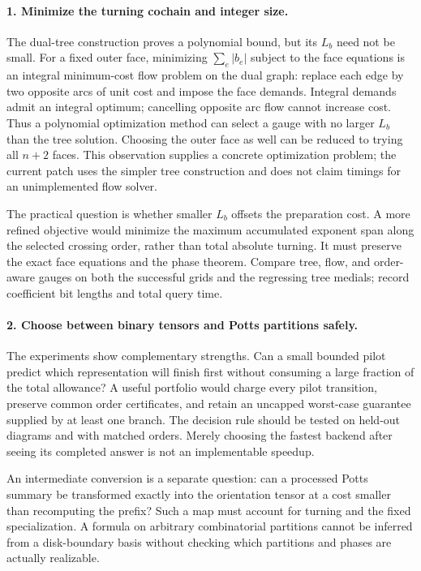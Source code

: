 \documentclass[11pt]{article}
\theoremstyle{definition}
\theoremstyle{remark}
\begin{document}
\paragraph{1. Minimize the turning cochain and integer size.}
The dual-tree construction proves a polynomial bound, but its $L_b$ need
not be small. For a fixed outer face, minimizing $\sum_e|b_e|$ subject to
the face equations is an integral minimum-cost flow problem on the dual
graph: replace each edge by two opposite arcs of unit cost and impose the
face demands. Integral demands admit an integral optimum; cancelling
opposite arc flow cannot increase cost. Thus a polynomial optimization
method can select a gauge with no larger $L_b$ than the tree solution.
Choosing the outer face as well can be reduced to trying all $n+2$ faces.
This observation supplies a concrete optimization problem; the current
patch uses the simpler tree construction and does not claim timings for
an unimplemented flow solver.

The practical question is whether smaller $L_b$ offsets the preparation
cost. A more refined objective would minimize the maximum accumulated
exponent span along the selected crossing order, rather than total
absolute turning. It must preserve the exact face equations and the
phase theorem. Compare tree, flow, and order-aware gauges on both the
successful grids and the regressing tree medials; record coefficient bit
lengths and total query time.

\paragraph{2. Choose between binary tensors and Potts partitions safely.}
The experiments show complementary strengths. Can a small bounded pilot
predict which representation will finish first without consuming a large
fraction of the total allowance? A useful portfolio would charge every
pilot transition, preserve common order certificates, and retain an
uncapped worst-case guarantee supplied by at least one branch. The
decision rule should be tested on held-out diagrams and with matched
orders. Merely choosing the fastest backend after seeing its completed
answer is not an implementable speedup.

An intermediate conversion is a separate question: can a processed Potts
summary be transformed exactly into the orientation tensor at a cost
smaller than recomputing the prefix? Such a map must account for turning
and the fixed specialization. A formula on arbitrary combinatorial
partitions cannot be inferred from a disk-boundary basis without checking
which partitions and phases are actually realizable.
\end{document}
